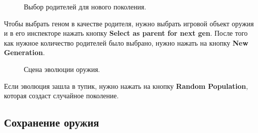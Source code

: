 \begin{figure}[ht]
    \begin{center}

        \caption{
            \label{SelectWeapon}
            Выбор родителей для нового поколения.}
    \end {center}
\end {figure}

Чтобы выбрать геном в качестве родителя, нужно выбрать игровой объект оружия и в его инспекторе нажать кнопку {\small \textbf{Select as parent for next gen}}. После того как нужное количество родителей было выбрано, нужно нажать на кнопку {\small \textbf{New Generation}}.

\begin{figure}[ht]
    \begin{center}

        \caption{
            \label{EvoScene}
            Сцена эволюции оружия.}
    \end {center}
\end {figure}

Если эволюция зашла в тупик, нужно нажать на кнопку {\small \textbf{Random Population}}, которая создаст случайное поколение.

\subsection{Сохранение оружия}


